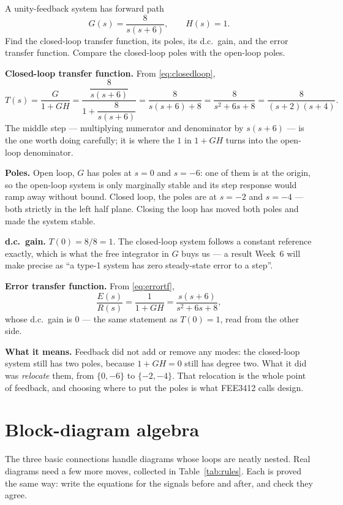 \documentclass[11pt,a4paper]{article}
\begin{document}
\begin{workedex}[breakable, title=Worked example 4.1 --- what feedback does to the poles]
A unity-feedback system has forward path
\[
  G(s)=\frac{8}{s(s+6)},\qquad H(s)=1 .
\]
Find the closed-loop transfer function, its poles, its d.c.\ gain, and the
error transfer function. Compare the closed-loop poles with the open-loop
poles.

\medskip
\textbf{Closed-loop transfer function.} From \eqref{eq:closedloop},
\[
  T(s)=\frac{G}{1+GH}
   =\frac{\dfrac{8}{s(s+6)}}{1+\dfrac{8}{s(s+6)}}
   =\frac{8}{s(s+6)+8}
   =\frac{8}{s^{2}+6s+8}
   =\frac{8}{(s+2)(s+4)} .
\]
The middle step --- multiplying numerator and denominator by $s(s+6)$ --- is
the one worth doing carefully; it is where the $1$ in $1+GH$ turns into the
open-loop denominator.

\medskip
\textbf{Poles.} Open loop, $G$ has poles at $s=0$ and $s=-6$: one of them is
at the origin, so the open-loop system is only marginally stable and its step
response would ramp away without bound. Closed loop, the poles are at $s=-2$
and $s=-4$ --- both strictly in the left half plane. Closing the loop has
moved both poles and made the system stable.

\medskip
\textbf{d.c.\ gain.} $T(0)=8/8=1$. The closed-loop system follows a constant
reference exactly, which is what the free integrator in $G$ buys us --- a
result Week~6 will make precise as ``a type-1 system has zero steady-state
error to a step''.

\medskip
\textbf{Error transfer function.} From \eqref{eq:errortf},
\[
  \frac{E(s)}{R(s)}=\frac{1}{1+GH}=\frac{s(s+6)}{s^{2}+6s+8} ,
\]
whose d.c.\ gain is $0$ --- the same statement as $T(0)=1$, read from the other
side.

\medskip
\textbf{What it means.} Feedback did not add or remove any modes: the
closed-loop system still has two poles, because $1+GH=0$ still has degree two.
What it did was \emph{relocate} them, from $\{0,-6\}$ to $\{-2,-4\}$. That
relocation is the whole point of feedback, and choosing where to put the poles
is what FEE3412 calls design.
\end{workedex}

\section{Block-diagram algebra}
\label{sec:algebra}

The three basic connections handle diagrams whose loops are neatly nested. Real
diagrams need a few more moves, collected in Table~\ref{tab:rules}. Each is
proved the same way: write the equations for the signals before and after, and
check they agree.
\end{document}
